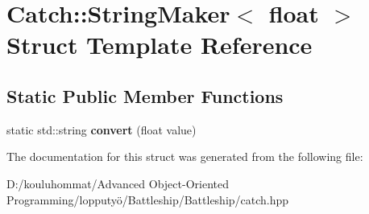 \hypertarget{struct_catch_1_1_string_maker_3_01float_01_4}{}\section{Catch\+:\+:String\+Maker$<$ float $>$ Struct Template Reference}
\label{struct_catch_1_1_string_maker_3_01float_01_4}
\subsection*{Static Public Member Functions}
\begin{DoxyCompactItemize}
\item 
\mbox{\label{struct_catch_1_1_string_maker_3_01float_01_4_a7ffacc6fa46a338200f3fbb2ee078648}} 
static std\+::string {\bfseries convert} (float value)
\end{DoxyCompactItemize}


The documentation for this struct was generated from the following file\+:\begin{DoxyCompactItemize}
\item 
D\+:/kouluhommat/\+Advanced Object-\/\+Oriented Programming/lopputyö/\+Battleship/\+Battleship/catch.\+hpp\end{DoxyCompactItemize}

